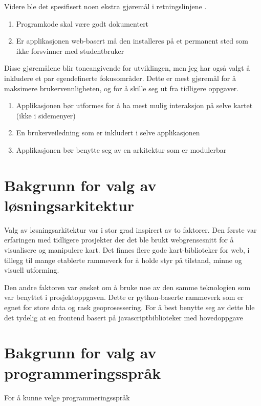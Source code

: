 Videre ble det spesifisert noen ekstra gjøremål i retningslinjene \cite{midtbø}. 

\begin{enumerate}[resume]
    \item Programkode skal være godt dokumentert
    \item Er applikasjonen web-basert må den installeres på et permanent sted som ikke forsvinner med studentbruker
\end{enumerate}

Disse gjøremålene blir toneangivende for utviklingen, men jeg har også valgt å inkludere et par egendefinerte fokusområder. Dette er mest gjøremål for å maksimere brukervennligheten, og for å skille seg ut fra tidligere oppgaver. 
\begin{enumerate}[resume]
    \item Applikasjonen bør utformes for å ha mest mulig interaksjon på selve kartet (ikke i sidemenyer)
    \item En brukerveiledning som er inkludert i selve applikasjonen
    \item Applikasjonen bør benytte seg av en arkitektur som er modulerbar
\end{enumerate}

\section{Bakgrunn for valg av løsningsarkitektur}
Valg av løsningsarkitektur var i stor grad inspirert av to faktorer. Den første var erfaringen med tidligere prosjekter der det ble brukt webgrensesnitt for å visualisere og manipulere kart. Det finnes flere gode kart-biblioteker for web, i tillegg til mange etablerte rammeverk for å holde styr på tilstand, minne og visuell utforming. 

Den andre faktoren var ønsket om å bruke noe av den samme teknologien som var benyttet i prosjektoppgaven. Dette er python-baserte rammeverk som er egnet for store data og rask geoprosessering. For å best benytte seg av dette ble det tydelig at en frontend basert på javascriptbiblioteker med hovedoppgave 

\section{Bakgrunn for valg av programmeringsspråk}
For å kunne velge programmeringsspråk 




\cite{Johanessen}